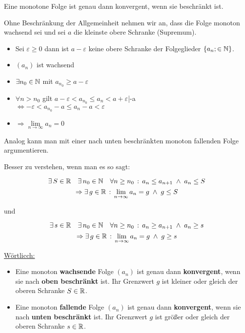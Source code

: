 \documentclass[../MAIN/main.tex]{subfiles}
\begin{document}
\begin{Theorem}
Eine monotone Folge ist genau dann konvergent, wenn sie beschränkt ist.
\end{Theorem}

\begin{Beweis}
Ohne Beschränkung der Allgemeinheit nehmen wir an, dass die Folge monoton wachsend sei und sei $a$ die kleinste obere Schranke (Supremum).
\begin{itemize}
\item Sei $\varepsilon\geq0$ dann ist $a-\varepsilon$ keine obere Schranke der Folgeglieder $\{a_n;\in\mathbb{N}\}$.
\item $(a_n)$ ist wachsend
\item $\exists n_0\in\mathbb{N}$ mit $a_{n_{0}} \geq a-\varepsilon$
\item $\forall n>n_0$ gilt $a-\varepsilon<a_{n_{0}}\leq a_n<a+\varepsilon$\qquad|-a\\
$\Leftrightarrow -\varepsilon < a_{n_{0}}-a\leq a_n-a<\varepsilon$
\item $\Rightarrow \lim\limits_{n\to\infty}a_n=0$
\end{itemize}
Analog kann man mit einer nach unten beschränkten monoton fallenden Folge argumentieren.
\end{Beweis}

Besser zu verstehen, wenn man es so sagt:

\begin{Theorem}
$$\exists\, S\in\mathbb{R} \quad \exists \,n_0\in\mathbb{N} \quad \forall n\geq n_0\,:\, a_n\leq a_{n+1}\; \land \; a_n\leq S$$
$$\Rightarrow \exists\, g\in\mathbb{R} \,:\, \lim\limits_{n\to\infty}a_n=g\;\land\; g\leq S $$
 \begin{center}und\end{center}
$$\exists \, s\in\mathbb{R} \quad\exists \, n_0\in\mathbb{N} \quad \forall n\geq n_0\,:\, a_n\geq a_{n+1}\; \land \;a_n\geq s$$
$$\Rightarrow \exists \, g\in\mathbb{R} \,:\, \lim\limits_{n\to\infty}a_n=g\;\land\; g\geq s$$
\end{Theorem}

	\underline{Wörtlicch:}
\begin{itemize}
\item Eine monoton \textbf{wachsende} Folge $(a_n)$ ist genau dann \textbf{konvergent}, wenn sie nach \textbf{oben beschränkt} ist. Ihr Grenzwert $g$ ist kleiner oder gleich der oberen Schranke $S\in\mathbb{R}$.
\item  Eine monoton \textbf{fallende} Folge $(a_n)$ ist genau dann \textbf{konvergent}, wenn sie nach \textbf{unten beschränkt} ist. Ihr Grenzwert $g$ ist größer oder gleich der oberen Schranke $s\in\mathbb{R}$.
\end{itemize}
\end{document}
